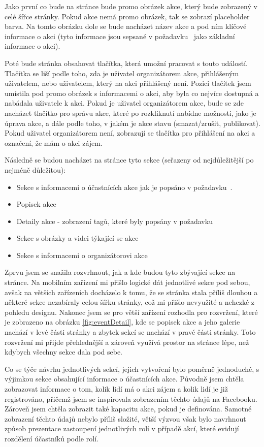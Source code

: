 Jako první co bude na stránce bude promo obrázek akce, který bude zobrazený v celé šířce stránky. Pokud akce nemá promo obrázek, tak se zobrazí placeholder barva. Na tomto obrázku dole se bude nacházet název akce a pod ním klíčové informace o akci (tyto informace jsou sepsané v požadavku~ jako základní informace o akci). 

Poté bude stránka obsahovat tlačítka, která umožní pracovat s touto událostí. Tlačítka se liší podle toho, zda je uživatel organizátorem akce, přihlášeným uživatelem, nebo uživatelem, který na akci přihlášený není. Pozici tlačítek jsem umístila pod promo obrázek s informacemi o akci, aby byla co nejvíce dostupná a nabádala uživatele k akci. Pokud je uživatel organizátorem akce, bude se zde nacházet tlačítko pro správu akce, které po rozkliknutí nabídne možnosti, jako je úprava akce, a dále podle toho, v jakém je akce stavu (smazat/zrušit, publikovat). Pokud uživatel organizátorem není, zobrazují se tlačítka pro přihlášení na akci a označení, že mám o akci zájem.

Následně se budou nacházet na stránce tyto sekce (seřazeny od nejdůležitější po nejméně důležitou):
\begin{itemize}
    \item Sekce s informacemi o účastnících akce jak je popsáno v požadavku~.
    \item Popisek akce
    \item Detaily akce - zobrazení tagů, které byly popsány v požadavku~
    \item Sekce s obrázky a videi týkající se akce
    \item Sekce s informacemi o organizátorovi akce
\end{itemize}

Zprvu jsem se snažila rozvrhnout, jak a kde budou tyto zbývající sekce na stránce. Na mobilním zařízení mi přišlo logické dát jednotlivé sekce pod sebou, avšak na větších zařízeních docházelo k tomu, že se stránka stala příliš dlouhou a některé sekce nezabíraly celou šířku stránky, což mi přišlo nevyužité a nehezké z pohledu designu. Nakonec jsem se pro větší zařízení rozhodla pro rozvržení, které je zobrazeno na obrázku \ref{fig:eventDetail}, kde se popisek akce a jeho galerie nachází v levé části stránky a zbytek sekcí se nachází v pravé části stránky. Toto rozvržení mi přijde přehlednější a zároveň využívá prostor na stránce lépe, než kdybych všechny sekce dala pod sebe. 

Co se týče návrhu jednotlivých sekcí, jejich vytvoření bylo poměrně jednoduché, s výjimkou sekce obsahující informace o účastnících akce. Původně jsem chtěla zobrazovat informace o tom, kolik lidí má o akci zájem a kolik lidí je již registrováno, přičemž jsem se inspirovala zobrazením těchto údajů na Facebooku. Zároveň jsem chtěla zobrazit také kapacitu akce, pokud je definována. Samotné zobrazení těchto údajů nebylo příliš složité, větší výzvou však bylo navrhnout způsob prezentace zastoupení jednotlivých rolí v případě akcí, které evidují rozdělení účastníků podle rolí.

